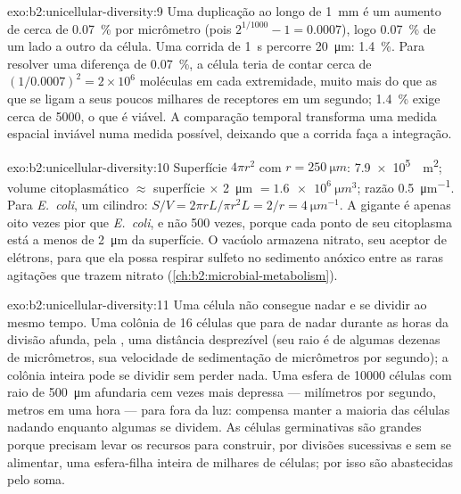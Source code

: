 \begin{solution}{exo:b2:unicellular-diversity:9}
Uma duplicação ao longo de \qty{1}{mm} é um aumento de cerca de
\qty{0.07}{\%} por
micrômetro (pois $2^{1/1000} - 1 = 0.0007$), logo \qty{0.07}{\%}
de um lado a outro da célula. Uma corrida de \qty{1}{s} percorre
\qty{20}{\micro m}: \qty{1.4}{\%}. Para resolver uma diferença de
\qty{0.07}{\%}, a célula teria de contar cerca de
$(1/0.0007)^2 = 2\times 10^6$ moléculas em cada
extremidade, muito mais do que as que se ligam a seus poucos milhares
de receptores em um segundo; \qty{1.4}{\%} exige cerca de \num{5000},
o que é viável. A comparação temporal transforma uma medida espacial
inviável numa medida possível, deixando que a corrida faça a
integração.
\end{solution}

\begin{solution}{exo:b2:unicellular-diversity:10}
Superfície $4\pi r^2$ com $r = \qty{250}{\micro m}$: \qty{7.9e5}{\micro
m^2}; volume citoplasmático $\approx$ superfície $\times$ \qty{2}{\micro m}
$= \qty{1.6e6}{\micro m^3}$; razão \qty{0.5}{\micro m^{-1}}. Para
\emph{E.~coli}, um cilindro: $S/V = 2\pi r L/\pi r^2 L = 2/r =
\qty{4}{\micro m^{-1}}$. A gigante é apenas oito vezes pior que
\emph{E.~coli}, e não 500 vezes, porque cada ponto de seu citoplasma
está a menos de \qty{2}{\micro m} da superfície. O vacúolo armazena
nitrato, seu aceptor de elétrons, para que ela possa respirar sulfeto
no sedimento anóxico entre as raras agitações que trazem nitrato
(\cref{ch:b2:microbial-metabolism}).
\end{solution}

\begin{solution}{exo:b2:unicellular-diversity:11}
Uma célula não consegue nadar e se dividir ao mesmo tempo. Uma colônia
de 16 células que para de nadar durante as horas da divisão afunda,
pela , uma distância desprezível (seu raio é de algumas
dezenas de micrômetros, sua velocidade de sedimentação de micrômetros
por segundo); a colônia inteira pode se dividir sem perder nada. Uma
esfera de \num{10000} células com raio de
\qty{500}{\micro m} afundaria cem vezes mais depressa ---
milímetros por segundo, metros em uma hora --- para fora da luz:
compensa manter a maioria das células nadando enquanto algumas se
dividem. As células germinativas são grandes porque precisam levar os
recursos para construir, por divisões sucessivas e sem se alimentar,
uma esfera-filha inteira de milhares de células; por isso são
abastecidas pelo soma.
\end{solution}

